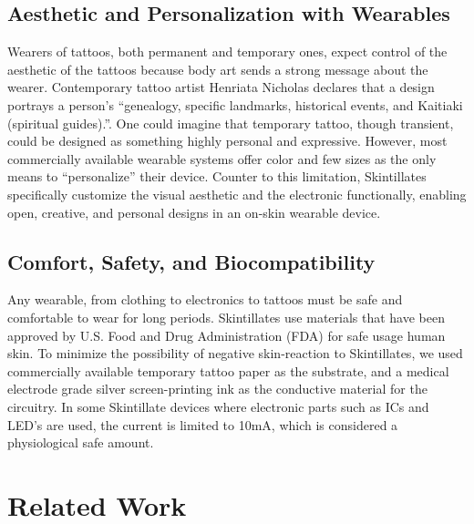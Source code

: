 \documentclass{sigchi}
\begin{document}
\subsection{Aesthetic and Personalization with Wearables}
Wearers of tattoos, both permanent and temporary ones, expect control of the aesthetic of the tattoos because body art sends a strong message about the wearer\cite{Doss:2009ee,McLeod:2014ua}. Contemporary tattoo artist Henriata Nicholas declares that a design portrays a person’s ``genealogy, specific landmarks, historical events, and Kaitiaki (spiritual guides).''\cite{Arp:2012ws}. One could imagine that temporary tattoo, though transient, could be designed as something highly personal and expressive. However, most commercially available wearable systems offer color and few sizes as the only means to “personalize” their device. Counter to this limitation, Skintillates specifically customize the visual aesthetic and the electronic functionally, enabling open, creative, and personal designs in an on-skin wearable device.

\subsection{Comfort, Safety, and Biocompatibility}
Any wearable, from clothing to electronics to tattoos must be safe and comfortable to wear for long periods.  Skintillates use materials that have been approved by U.S. Food and Drug Administration (FDA) for safe usage human skin. To minimize the possibility of negative skin-reaction to Skintillates, we used commercially available temporary tattoo paper as the substrate, and a medical electrode grade silver screen-printing ink as the conductive material for the circuitry\cite{Anonymous:6vWXbuD5}. In some Skintillate devices where electronic parts such as ICs and LED's are used, the current is limited to 10mA, which is considered a physiological safe amount\cite{Scherz:_BfVY1Mg}. 

\section{Related Work}
\end{document}
